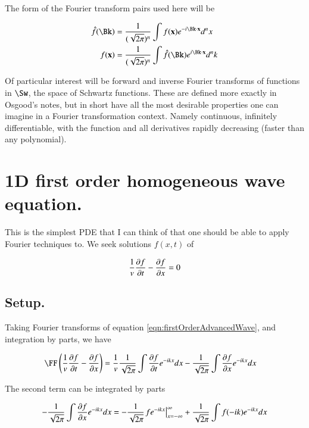 The form of the Fourier transform pairs used here will be

\begin{align*}
\hat{f}(\Bk) &= \frac{1}{(\sqrt{2\pi})^n} \int f(\Bx) e^{-i \Bk \cdot \Bx } d^n x \\
{f}(\Bx) &= \frac{1}{(\sqrt{2\pi})^n} \int \hat{f}(\Bk) e^{i \Bk \cdot \Bx } d^n k \\
\end{align*}

Of particular interest will be forward and inverse Fourier transforms
of functions in $\Sw$, the space of Schwartz functions.  These are defined
more exactly in Osgood's notes, but in short have all the most desirable
properties one can imagine in a Fourier transformation context.  Namely
continuous, infinitely differentiable, with the function and all 
derivatives rapidly decreasing (faster than any polynomial).

\section{1D first order homogeneous wave equation. }

This is the simplest PDE that I can think of that one should be able 
to apply Fourier techniques to.  We seek solutions $f(x,t)$ of

\begin{align}\label{eqn:firstOrderAdvancedWave}
\inv{v} \PD{t}{f} - \PD{x}{f} = 0
\end{align}

\subsection{Setup. }

Taking Fourier transforms of equation \ref{eqn:firstOrderAdvancedWave}, and integration
by parts, we have

\begin{align*}
\FF\left(\inv{v} \PD{t}{f} - \PD{x}{f} \right) &=
\inv{v} \inv{\sqrt{2\pi}} \int \PD{t}{f} e^{-i k x} dx - \inv{\sqrt{2\pi}} \int \PD{x}{f} e^{-i k x } dx
\end{align*}

The second term can be integrated by parts

\begin{align*}
- \inv{\sqrt{2\pi}} \int \PD{x}{f} e^{-i k x } dx
=
- \inv{\sqrt{2\pi}} {\left. {f} e^{-i k x } \right\vert}_{x = -\infty}^{\infty}
+ \inv{\sqrt{2\pi}} \int {f} (-i k ) e^{-i k x } dx
\end{align*}

